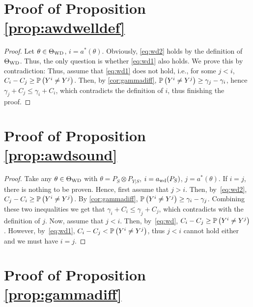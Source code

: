 \section*{Proof of Proposition \ref{prop:awdwelldef}}
\begin{proof}
	Let $\theta\in \Theta_{\mathrm{WD}}$, $i = a^*(\theta)$. Obviously, \eqref{eq:wd2} holds by the definition of $\Theta_{\mathrm{WD}}$.
	Thus, the only question is whether \eqref{eq:wd1} also holds.
	We prove this by contradiction:
	Thus, assume that \eqref{eq:wd1} does not hold, i.e., for some $j<i$, $C_i-C_j \ge \mathbb{P}\left(Y^i \ne Y^j\right)$. Then, by \cref{cor:gammadiff}, $\mathbb{P}\left( Y^i \ne Y^j\right) \ge \gamma_j - \gamma_i$, hence $\gamma_j + C_j \le \gamma_i + C_i$, which contradicts the definition of $i$, thus finishing the proof.
	\end{proof}
\section*{Proof of Proposition \ref{prop:awdsound}}
\begin{proof}
	Take any $\theta\in \Theta_{\mathrm{WD}}$ with $\theta = P_S\otimes P_{Y|S}$, $i = a_{\mathrm{wd}}(P_S)$, $j = a^*(\theta)$.
	If $i=j$, there is nothing to be proven. Hence, first assume that $j>i$. Then, by~\eqref{eq:wd2}, $C_j - C_i \ge \mathbb{P}\left(Y^i \ne Y^j\right)$.
	By \cref{cor:gammadiff}, $\mathbb{P}\left(Y^i \ne Y^j \right) \ge \gamma_i - \gamma_j$. Combining these two inequalities we get that
	$\gamma_i + C_i \le \gamma_j + C_j$, which contradicts with the definition of $j$.
	Now, assume that $j<i$. Then, by~\eqref{eq:wd}, $C_i - C_j \ge \mathbb{P}\left(Y^i \ne Y^j\right)$.
	However, by~\eqref{eq:wd1}, $C_i -C_j < \mathbb{P}\left(Y^i \ne Y^j\right)$, thus $j<i$ cannot hold either and we must have $i=j$.
	\end{proof}

\section*{Proof of Proposition \ref{prop:gammadiff}}

